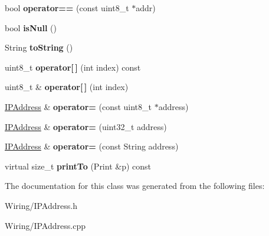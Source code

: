 \begin{DoxyCompactItemize}
\item 
\hypertarget{class_i_p_address_af685847e3b72825b9c9f0ed5b828683f}{}bool {\bfseries operator==} (const uint8\+\_\+t $\ast$addr)\label{class_i_p_address_af685847e3b72825b9c9f0ed5b828683f}

\item 
\hypertarget{class_i_p_address_a25dd61caa38bb38961f982406fddceea}{}bool {\bfseries is\+Null} ()\label{class_i_p_address_a25dd61caa38bb38961f982406fddceea}

\item 
\hypertarget{class_i_p_address_af00071ac24a5ed453e323f1535c9f33c}{}String {\bfseries to\+String} ()\label{class_i_p_address_af00071ac24a5ed453e323f1535c9f33c}

\item 
\hypertarget{class_i_p_address_ac1e9d3628dc5bc5151324c80a69ad159}{}uint8\+\_\+t {\bfseries operator\mbox{[}$\,$\mbox{]}} (int index) const \label{class_i_p_address_ac1e9d3628dc5bc5151324c80a69ad159}

\item 
\hypertarget{class_i_p_address_ab7c569a71648e9235ebb63d7a6d58143}{}uint8\+\_\+t \& {\bfseries operator\mbox{[}$\,$\mbox{]}} (int index)\label{class_i_p_address_ab7c569a71648e9235ebb63d7a6d58143}

\item 
\hypertarget{class_i_p_address_a0dc5d0937fec535ef61daa5d05f30d3a}{}\hyperlink{class_i_p_address}{I\+P\+Address} \& {\bfseries operator=} (const uint8\+\_\+t $\ast$address)\label{class_i_p_address_a0dc5d0937fec535ef61daa5d05f30d3a}

\item 
\hypertarget{class_i_p_address_af80a0f81dc5861ae3240a4331c5fc14c}{}\hyperlink{class_i_p_address}{I\+P\+Address} \& {\bfseries operator=} (uint32\+\_\+t address)\label{class_i_p_address_af80a0f81dc5861ae3240a4331c5fc14c}

\item 
\hypertarget{class_i_p_address_aea4405da8c3a18834d97c1afacb73875}{}\hyperlink{class_i_p_address}{I\+P\+Address} \& {\bfseries operator=} (const String address)\label{class_i_p_address_aea4405da8c3a18834d97c1afacb73875}

\item 
\hypertarget{class_i_p_address_a2dd7f6c455c2f33e4639944f751930db}{}virtual size\+\_\+t {\bfseries print\+To} (Print \&p) const \label{class_i_p_address_a2dd7f6c455c2f33e4639944f751930db}

\end{DoxyCompactItemize}


The documentation for this class was generated from the following files\+:\begin{DoxyCompactItemize}
\item 
Wiring/I\+P\+Address.\+h\item 
Wiring/I\+P\+Address.\+cpp\end{DoxyCompactItemize}

